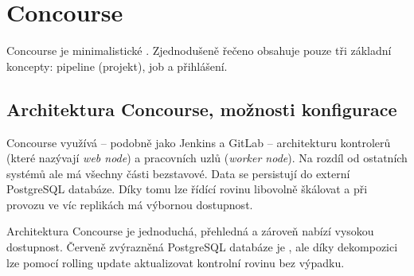 \section{Concourse}
    Concourse je minimalistické \CI. Zjednodušeně řečeno obsahuje pouze tři základní koncepty: pipeline (projekt), job a přihlášení.

    \subsection{Architektura Concourse, možnosti konfigurace}
        Concourse využívá -- podobně jako Jenkins a GitLab -- architekturu kontrolerů (které nazývají \textit{web node}) a pracovních uzlů (\textit{worker node}). Na rozdíl od ostatních systémů ale má všechny části bezstavové. Data se persistují do externí PostgreSQL databáze. Díky tomu lze řídící rovinu libovolně škálovat a při provozu ve víc replikách má výbornou dostupnost.

        \begin{iffigure}
            \centering
            \caption{Architektura Concourse je jednoduchá, přehledná a zároveň nabízí vysokou dostupnost. Červeně zvýrazněná PostgreSQL databáze je , ale díky dekompozici lze pomocí rolling update aktualizovat kontrolní rovinu bez výpadku.}
            \label{pic:concourse-architecture}
        \end{iffigure}


